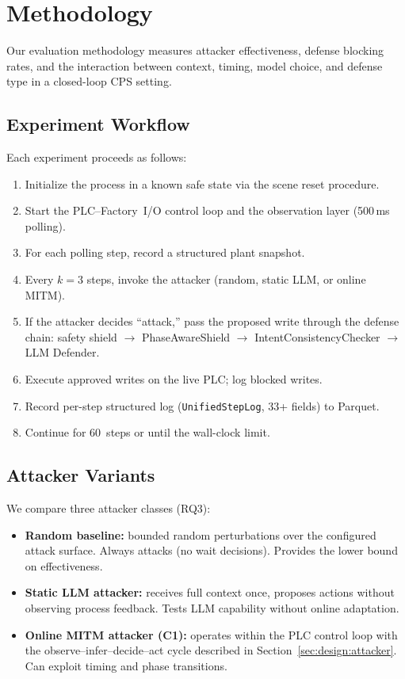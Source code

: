 \section{Methodology}
\label{sec:methodology}

Our evaluation methodology measures attacker effectiveness, defense blocking rates, and the interaction between context, timing, model choice, and defense type in a closed-loop CPS setting.

\subsection{Experiment Workflow}
Each experiment proceeds as follows:
\begin{enumerate}[leftmargin=1.2em]
    \item Initialize the process in a known safe state via the scene reset procedure.
    \item Start the PLC--Factory~I/O control loop and the observation layer (500\,ms polling).
    \item For each polling step, record a structured plant snapshot.
    \item Every $k{=}3$ steps, invoke the attacker (random, static LLM, or online MITM).
    \item If the attacker decides ``attack,'' pass the proposed write through the defense chain: safety shield $\to$ PhaseAwareShield $\to$ IntentConsistencyChecker $\to$ LLM Defender.
    \item Execute approved writes on the live PLC; log blocked writes.
    \item Record per-step structured log (\texttt{UnifiedStepLog}, 33+ fields) to Parquet.
    \item Continue for 60~steps or until the wall-clock limit.
\end{enumerate}

\subsection{Attacker Variants}
We compare three attacker classes (RQ3):
\begin{itemize}[leftmargin=1.2em]
    \item \textbf{Random baseline:} bounded random perturbations over the configured attack surface. Always attacks (no wait decisions). Provides the lower bound on effectiveness.
    \item \textbf{Static LLM attacker:} receives full context once, proposes actions without observing process feedback. Tests LLM capability without online adaptation.
    \item \textbf{Online MITM attacker (C1):} operates within the PLC control loop with the observe--infer--decide--act cycle described in Section~\ref{sec:design:attacker}. Can exploit timing and phase transitions.
\end{itemize}

